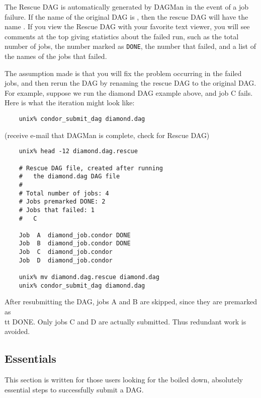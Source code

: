The Rescue DAG is automatically generated by DAGMan in the event of a job
failure.  If the name of the original DAG is , then the
rescue DAG will have the name .  If you view the
Rescue DAG with your favorite text viewer, you will see comments at the top
giving statistics about the failed run, such as the total number of jobs, the
number marked as {\tt DONE}, the number that failed, and a list of the names
of the jobs that failed.

The assumption made is that you will fix the problem occurring in the failed
jobs, and then rerun the DAG by renaming the rescue DAG to the original DAG.  
For example, suppose we run the diamond DAG example above, and job C fails.
Here is what the iteration might look like:

\begin{verbatim}
	unix% condor_submit_dag diamond.dag
\end{verbatim}
(receive e-mail that DAGMan is complete, check for Rescue DAG)
\begin{verbatim}
	unix% head -12 diamond.dag.rescue

	# Rescue DAG file, created after running
	#   the diamond.dag DAG file
	#
	# Total number of jobs: 4
	# Jobs premarked DONE: 2
	# Jobs that failed: 1
	#   C

	Job  A  diamond_job.condor DONE
	Job  B  diamond_job.condor DONE
	Job  C  diamond_job.condor
	Job  D  diamond_job.condor

	unix% mv diamond.dag.rescue diamond.dag
	unix% condor_submit_dag diamond.dag
\end{verbatim}

After resubmitting the DAG, jobs A and B are skipped, since they are premarked
as {\\tt DONE}.  Only jobs C and D are actually submitted.  Thus redundant work is
avoided.

\subsection{\label{dagman:essentials}Essentials}

This section is written for those users looking for the boiled down,
absolutely essential steps to successfully submit a DAG.

